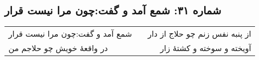 \begin{center}
\section*{شماره ۳۱: شمع آمد و گفت:‌چون مرا نیست قرار}
\label{sec:031}
\begin{longtable}{l p{0.5cm} r}
شمع آمد و گفت:‌چون مرا نیست قرار
&&
از پنبه نفس زنم چو حلاج از دار
\\
در واقعهٔ خویش چو حلاجم من
&&
آویخته و سوخته و کشتهٔ زار
\\
\end{longtable}
\end{center}
